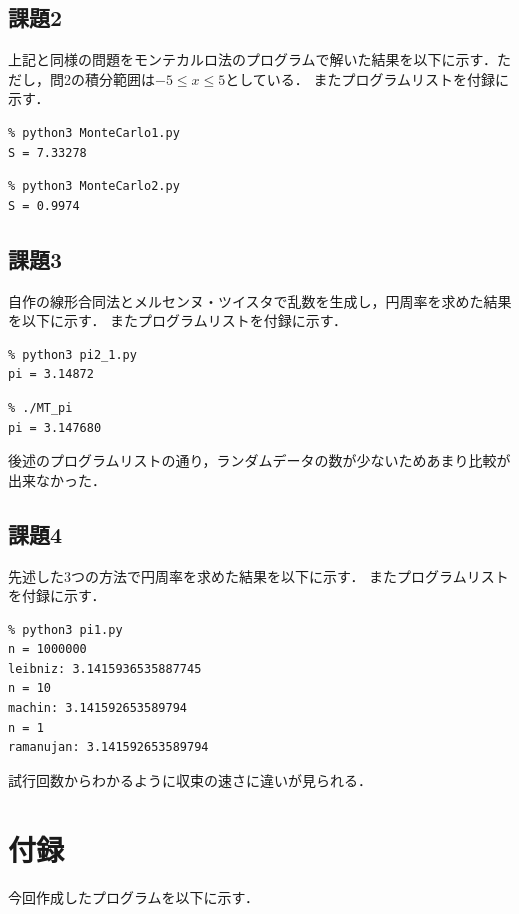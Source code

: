 \documentclass[a4paper, titlepage]{jsarticle}
\begin{document}
	\subsection{課題2}
	上記と同様の問題をモンテカルロ法のプログラムで解いた結果を以下に示す．ただし，問2の積分範囲は$-5 {\leq} x {\leq} 5$としている．
	またプログラムリストを付録に示す．
		\begin{lstlisting}
% python3 MonteCarlo1.py
S = 7.33278
		\end{lstlisting}
		\begin{lstlisting}
% python3 MonteCarlo2.py
S = 0.9974
		\end{lstlisting}

	\subsection{課題3}
	自作の線形合同法とメルセンヌ・ツイスタで乱数を生成し，円周率を求めた結果を以下に示す．
	またプログラムリストを付録に示す．
		\begin{lstlisting}
% python3 pi2_1.py
pi = 3.14872
		\end{lstlisting}
		\begin{lstlisting}
% ./MT_pi
pi = 3.147680
		\end{lstlisting}
	後述のプログラムリストの通り，ランダムデータの数が少ないためあまり比較が出来なかった．

	\subsection{課題4}
	先述した3つの方法で円周率を求めた結果を以下に示す．
	またプログラムリストを付録に示す．
		\begin{lstlisting}
% python3 pi1.py
n = 1000000
leibniz: 3.1415936535887745
n = 10
machin: 3.141592653589794
n = 1
ramanujan: 3.141592653589794
		\end{lstlisting}
	試行回数からわかるように収束の速さに違いが見られる．

	\section{付録}
	今回作成したプログラムを以下に示す．
\end{document}
